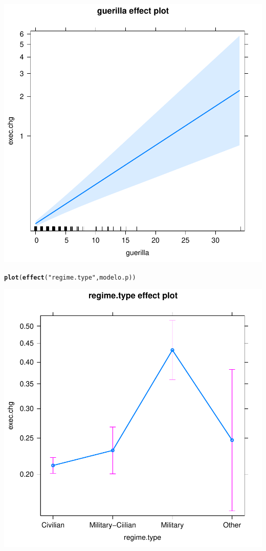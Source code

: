 \documentclass[onesided]{article}\usepackage[]{graphicx}\usepackage[]{color}
\makeatletter
\def\maxwidth{ %
  \ifdim\Gin@nat@width>\linewidth
    \linewidth
  \else
    \Gin@nat@width
  \fi
}
\newcommand{\hlstr}[1]{\textcolor[rgb]{0.192,0.494,0.8}{#1}}%
\newcommand{\hlstd}[1]{\textcolor[rgb]{0.345,0.345,0.345}{#1}}%
\newcommand{\hlkwd}[1]{\textcolor[rgb]{0.737,0.353,0.396}{\textbf{#1}}}%
\newenvironment{kframe}{%
 \def\at@end@of@kframe{}%
 \ifinner\ifhmode%
  \def\at@end@of@kframe{\end{minipage}}%
  \begin{minipage}{\columnwidth}%
 \fi\fi%
 \def\FrameCommand##1{\hskip\@totalleftmargin \hskip-\fboxsep
 \colorbox{shadecolor}{##1}\hskip-\fboxsep
     \hskip-\linewidth \hskip-\@totalleftmargin \hskip\columnwidth}%
 \MakeFramed {\advance\hsize-\width
   \@totalleftmargin\z@ \linewidth\hsize
   \@setminipage}}%
 {\par\unskip\endMakeFramed%
 \at@end@of@kframe}
\makeatother
\begin{document}
{\centering \includegraphics[width=\maxwidth]{figure/pp-2} 

}


\begin{kframe}\begin{alltt}
\hlkwd{plot}\hlstd{(}\hlkwd{effect}\hlstd{(}\hlstr{"regime.type"}\hlstd{, modelo.p))}
\end{alltt}
\end{kframe}

{\centering \includegraphics[width=\maxwidth]{figure/pp-3} 

}
\end{document}
